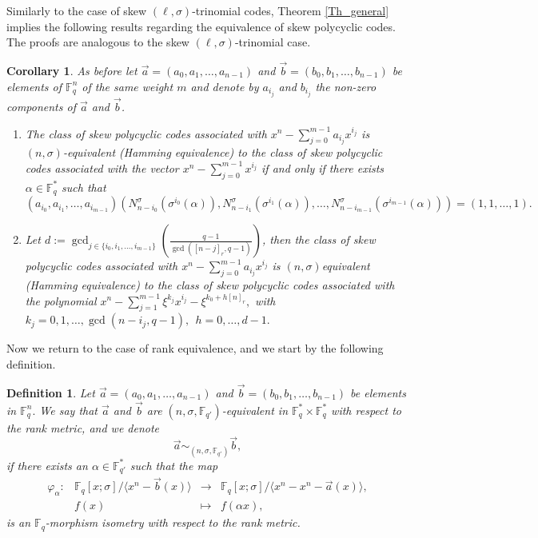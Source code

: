 \documentclass[12pt,paper]{article}
\theoremstyle{plain}
\newtheorem{corollary}[theorem]{Corollary}
\newtheorem{definition}[theorem]{Definition}
\def\dsum #1#2{\displaystyle{\sum_{#1}^{#2}}}
\newcommand{\Fq}{\mathbb{F}_{q}}
\begin{document}
Similarly to the case of skew $(\ell,\sigma)$-trinomial codes, Theorem \ref{Th_general} implies the following results regarding the equivalence of skew polycyclic codes. The proofs are analogous to the skew $(\ell,\sigma)$-trinomial case. 

\begin{corollary}\label{Equiv_General2}
As before let $ \vec{a}=(a_0,a_1,\ldots, a_{n-1})$ and $ \vec{b}=(b_0,b_1,\ldots, b_{n-1})$ be elements of $\mathbb{F}_q^{n}$  
of the same weight $m$  and denote by $ a_{i_j}$ and $  b_{i_j}$  the non-zero components of $\vec{a}$ and $\vec{b}$. 
\begin{enumerate}
    \item     The class of skew polycyclic  codes associated with $ x^n-\dsum{j=0}{m-1} a_{i_j} x^{i_j} $ is $(n,\sigma)$-equivalent (Hamming equivalence) to the class of  skew polycyclic  codes associated with the vector  $x^n-\dsum{j=0}{m-1}  x^{i_j}$  if and only if there exists $\alpha \in \Fq^*$ such that
    $$ ( a_{i_0}, a_{i_1},\ldots, a_{i_{m-1}}) 
    \left( N_{n-i_0}^{\sigma}(\sigma^{i_0}(\alpha)),  N^{\sigma}_{n-i_1}(\sigma^{i_1}(\alpha)), \ldots, N^{\sigma}_{n-i_{m-1}}(\sigma^{i_{m-1}}(\alpha))\right) = (1, 1,\ldots, 1 ).$$  
   

   
     \item    Let  $ d:= \gcd_{ j\in \{i_0,i_1,\ldots, i_{m-1} \} }\left(\frac{q-1}{ \gcd([n-j]_r,q-1)}\right) $, then the  class of  skew polycyclic  codes associated with  $ x^n-\dsum{j=0}{m-1} a_{i_j} x^{i_j} $ is $(n,\sigma)$equivalent (Hamming equivalence) to the class of  skew polycyclic  codes associated with the polynomial  $ x^n-\dsum{j=1}{m-1} \xi^{k_j} x^{i_j}- \xi^{k_0+h[n]_r} ,$ with $k_j=0,1,\ldots, \gcd(n-i_j,q-1) , \ \ h=0,\ldots, d-1.$ 
\end{enumerate}
\end{corollary} 

\hspace{0.3cm}

Now we return to the case of rank equivalence, and we start by the following definition. 
\begin{definition} Let $ \vec{a} = (a_0, a_1, \ldots, a_{n-1}) $ and $ \vec{b} = (b_0, b_1, \ldots, b_{n-1}) $ be elements in $\mathbb{F}_q^n .$ We say that $\vec{a}$ and $\vec{b}$ are {$( n,\sigma, \mathbb{F}_{q'})$-equivalent} in $\mathbb{F}_q^* \times \mathbb{F}_q^*$ with respect to the rank metric, and we  denote
$$ \vec{a} \sim_{( n,\sigma, \mathbb{F}_{q'})} \vec{b},$$
if there exists an $\alpha \in \mathbb{F}_{q'}^* $ such that the map
  \begin{equation}
  	\begin{array}{cccc}
  	\varphi_{\alpha}:& \mathbb{F}_q[x;\sigma] /\langle x^n-\vec{b}(x) \rangle  &\longrightarrow & \mathbb{F}_q[x;\sigma] /\langle x^n- x^n-\vec{a}(x) \rangle, \\ 
  	& f(x) & \longmapsto &  f(\alpha x),
  	\end{array}
  	\end{equation} 
is an  $\mathbb{F}_q$-morphism isometry with respect to the rank metric. 
\end{definition}
\end{document}
